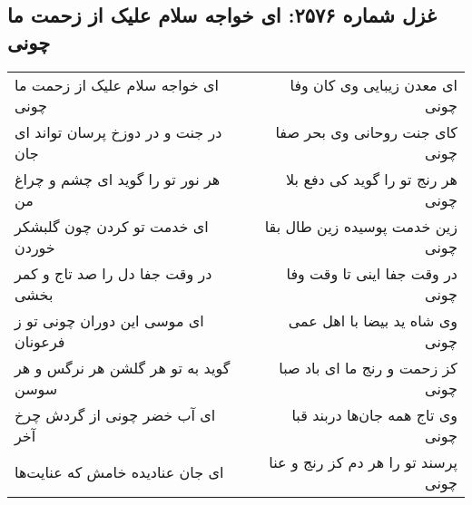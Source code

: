 \begin{center}
\section*{غزل شماره ۲۵۷۶: ای خواجه سلام علیک از زحمت ما چونی}
\label{sec:2576}
\begin{longtable}{l p{0.5cm} r}
ای خواجه سلام علیک از زحمت ما چونی
&&
ای معدن زیبایی وی کان وفا چونی
\\
در جنت و در دوزخ پرسان تواند ای جان
&&
کای جنت روحانی وی بحر صفا چونی
\\
هر نور تو را گوید ای چشم و چراغ من
&&
هر رنج تو را گوید کی دفع بلا چونی
\\
ای خدمت تو کردن چون گلبشکر خوردن
&&
زین خدمت پوسیده زین طال بقا چونی
\\
در وقت جفا دل را صد تاج و کمر بخشی
&&
در وقت جفا اینی تا وقت وفا چونی
\\
ای موسی این دوران چونی تو ز فرعونان
&&
وی شاه ید بیضا با اهل عمی چونی
\\
گوید به تو هر گلشن هر نرگس و هر سوسن
&&
کز زحمت و رنج ما ای باد صبا چونی
\\
ای آب خضر چونی از گردش چرخ آخر
&&
وی تاج همه جان‌ها دربند قبا چونی
\\
ای جان عنادیده خامش که عنایت‌ها
&&
پرسند تو را هر دم کز رنج و عنا چونی
\\
\end{longtable}
\end{center}
